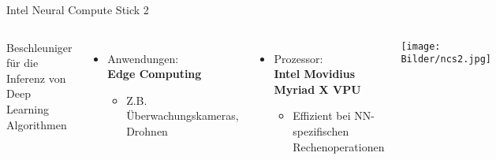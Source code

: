 \begin{frame}{Intel Neural Compute Stick 2}
    \begin{columns}[T]
        Beschleuniger für die Inferenz von Deep Learning Algorithmen
        \vspace{0.3cm}

        \begin{itemize}
            \item Anwendungen:\\\textbf{Edge Computing}
            \begin{itemize}
                \item Z.B. Überwachungskameras, Drohnen
            \end{itemize}
        \end{itemize}

        \begin{itemize}    
            \item Prozessor:\\\textbf{Intel Movidius Myriad X VPU}
            \begin{itemize}
                \item Effizient bei NN-spezifischen Rechenoperationen
            \end{itemize}    
        \end{itemize}
        
        \vspace{1cm}
        \texttt{[image: Bilder/ncs2.jpg]}
    \end{columns}



    

        
\end{frame}